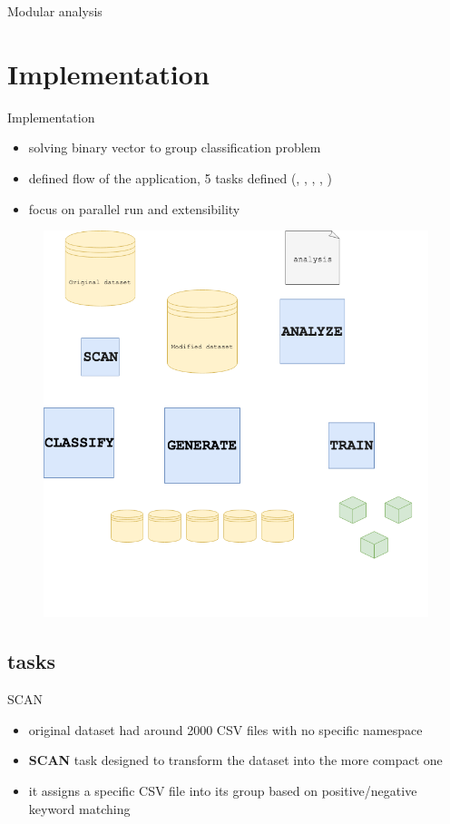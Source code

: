 \documentclass{beamer}
\newcommand\Fontsmall{\fontsize{8}{7.2}\selectfont}
\begin{document}
\begin{darkframes}
\begin{frame}{Modular analysis}
    \end{frame}

    \section{Implementation}
    \begin{frame}{Implementation}
      \begin{itemize}
        \Fontsmall
        \item solving binary vector to group classification problem
        \item defined flow of the application, 5 tasks defined ({}, {}, {}, {}, {})
        \item focus on parallel run and extensibility
      \end{itemize}
      \begin{figure}[H]
        \centering
        \includegraphics[width=0.5\linewidth]{../tex/images/thesis_model_img}
      \end{figure}     
    \end{frame}

    \subsection{tasks}
    \begin{frame}{SCAN}
      \begin{itemize}
        \item original dataset had around 2000 CSV files with no specific namespace
        \item \textbf{SCAN} task designed to transform the dataset into the more compact one
        \item it assigns a specific CSV file into its group based on positive/negative keyword matching
      \end{itemize}
    \end{frame}


\end{darkframes}
\end{document}
